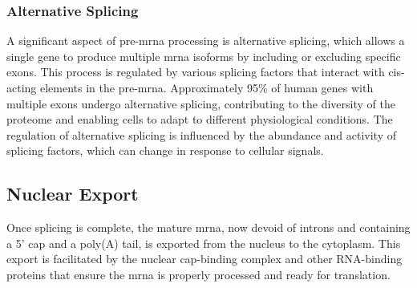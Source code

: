 \subsubsection{Alternative Splicing}
A significant aspect of pre-\gls{mrna} processing is alternative splicing,
which allows a single gene to produce multiple \gls{mrna} isoforms by including
or excluding specific exons.
This process is regulated by various splicing factors that interact with
cis-acting elements in the
pre-\gls{mrna}\supercite{le_alternative_2015,murphy_therapeutic_2022}.
Approximately 95\% of human genes with multiple exons undergo alternative
splicing, contributing to the diversity of the proteome and enabling cells to
adapt to different physiological conditions\supercite{le_alternative_2015}.
The regulation of alternative splicing is influenced by the abundance and
activity of splicing factors, which can change in response to cellular
signals\supercite{wang_mechanism_2015}.

\subsection{Nuclear Export}
Once splicing is complete, the mature \gls{mrna}, now devoid of introns and
containing a 5' cap and a poly(A) tail, is exported from the nucleus to the
cytoplasm.
This export is facilitated by the nuclear cap-binding complex and other
RNA-binding proteins that ensure the \gls{mrna} is properly processed and ready
for translation\supercite{soucek_evolutionarily_2016}.
